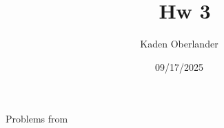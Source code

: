 


\title{\textbf{\myclass{\ballocks}\ Hw 3}}
\author{Kaden Oberlander}
\date{09/17/2025}
\newcommand{\ballocks}{Uwogic}


	\hypersetup{bookmarksnumbered=true,}
	\maketitle
	Problems from \cite{\ballocks}
	
	
\setcounter{equation}{0}	
\begin{problem*}{1}{}

\end{problem*}

\setcounter{equation}{0}
\begin{problem*}{2}{}

\end{problem*}


 \vfill





